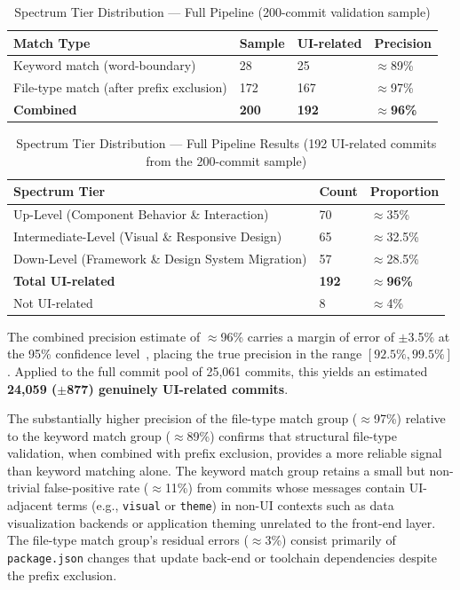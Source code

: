\documentclass{article}
\begin{document}
\begin{table}[htbp]
\centering
\caption{Spectrum Tier Distribution --- Full Pipeline
(200-commit validation sample)}
\label{tab:phase3_full}
\begin{tabularx}{\textwidth}{l X X X}
\toprule
\textbf{Match Type} & \textbf{Sample} & \textbf{UI-related} &
\textbf{Precision} \\
\midrule
Keyword match (word-boundary) & 28 & 25 & $\approx$89\% \\
File-type match (after prefix exclusion) & 172 & 167 & $\approx$97\% \\
\midrule
\textbf{Combined} & \textbf{200} & \textbf{192} & $\approx$\textbf{96\%} \\
\bottomrule
\end{tabularx}
\end{table}

\begin{table}[htbp]
\centering
\caption{Spectrum Tier Distribution --- Full Pipeline Results
(192 UI-related commits from the 200-commit sample)}
\label{tab:phase3_tiers}
\begin{tabularx}{\textwidth}{l X X}
\toprule
\textbf{Spectrum Tier} & \textbf{Count} & \textbf{Proportion} \\
\midrule
Up-Level (Component Behavior \& Interaction) & 70 & $\approx$35\% \\
Intermediate-Level (Visual \& Responsive Design) & 65 & $\approx$32.5\% \\
Down-Level (Framework \& Design System Migration) & 57 & $\approx$28.5\% \\
\midrule
\textbf{Total UI-related} & \textbf{192} & $\approx$\textbf{96\%} \\
Not UI-related & 8 & $\approx$4\% \\
\bottomrule
\end{tabularx}
\end{table}

The combined precision estimate of $\approx$96\% carries a margin of
error of $\pm$3.5\% at the 95\% confidence
level~\cite{vidoni2022systematic}, placing the true precision in the range
$[92.5\%, 99.5\%]$. Applied to the full commit pool of 25,061 commits,
this yields an estimated \textbf{24,059 ($\pm$877) genuinely
UI-related commits}.

The substantially higher precision of the file-type match group
($\approx$97\%) relative to the keyword match group ($\approx$89\%)
confirms that structural file-type validation, when combined with prefix
exclusion, provides a more reliable signal than keyword matching alone.
The keyword match group retains a small but non-trivial false-positive
rate ($\approx$11\%) from commits whose messages contain UI-adjacent
terms (e.g., \texttt{visual} or \texttt{theme}) in non-UI contexts such
as data visualization backends or application theming unrelated to the
front-end layer. The file-type match group's residual errors
($\approx$3\%) consist primarily of \texttt{package.json} changes that
update back-end or toolchain dependencies despite the prefix exclusion.
\end{document}
